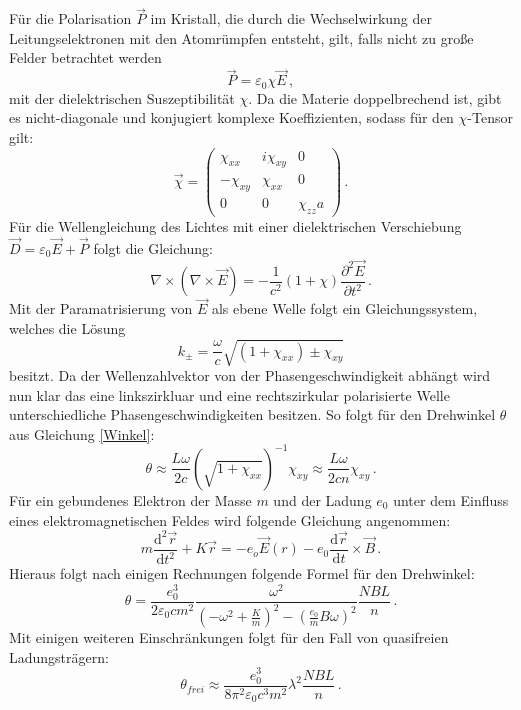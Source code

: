 Für die Polarisation $\vec{P}$ im Kristall, die durch die Wechselwirkung der Leitungselektronen mit den Atomrümpfen entsteht, gilt, falls nicht zu große Felder betrachtet werden
\begin{equation*}
	\vec{P}=\varepsilon_0 \chi \vec{E} \, \mathrm{,}
\end{equation*}
mit der dielektrischen Suszeptibilität $\chi$. Da die Materie doppelbrechend ist, gibt es nicht-diagonale und konjugiert komplexe Koeffizienten, sodass für den $\chi$-Tensor gilt:
\begin{equation*}
	\vec{\chi} =
	\begin{pmatrix}
		\chi_{xx} & i\chi_{xy} & 0 \\
		-\chi_{xy} & \chi_{xx} & 0 \\
		0 & 0 & \chi_{zz}a
	\end{pmatrix} \, \mathrm{.}
\end{equation*}
Für die Wellengleichung des Lichtes mit einer dielektrischen Verschiebung $\vec{D}=\varepsilon_0 \vec{E} + \vec{P}$ folgt die Gleichung:
\begin{equation*}
	\nabla \times (\nabla \times \vec{E}) = -\frac{1}{c^2}(1+\chi)\frac{\partial^2\vec{E}}{\partial t^2} \, \mathrm{.}
\end{equation*}
Mit der Paramatrisierung von $\vec{E}$ als ebene Welle folgt ein Gleichungssystem, welches die
Lösung
\begin{equation*}
	k_{\pm} = \frac{\omega}{c}\sqrt{(1+\chi_{xx}) \pm \chi_{xy}}
\end{equation*}
besitzt. Da der Wellenzahlvektor von der Phasengeschwindigkeit abhängt wird nun klar das eine linkszirkluar und eine rechtszirkular polarisierte Welle unterschiedliche Phasengeschwindigkeiten besitzen. So folgt für den Drehwinkel $\theta$ aus Gleichung \eqref{Winkel}:
\begin{equation*}
	\theta \approx \frac{L\omega}{2c}(\sqrt{1+\chi_{xx}})^{-1}\chi_{xy} \approx \frac{L\omega}{2cn}\chi_{xy} \, \mathrm{.}
\end{equation*}
Für ein gebundenes Elektron der Masse $m$ und der Ladung $e_0$ unter dem Einfluss eines elektromagnetischen Feldes wird folgende Gleichung angenommen:
\begin{equation*}
	m\frac{\mathrm{d}^2\vec{r}}{\mathrm{d}t^2}+K\vec{r} = - e_o \vec{E}(r) -e_0 \frac{\mathrm{d}\vec{r}}{\mathrm{d}t}\times \vec{B} \, \mathrm{.}
\end{equation*}
Hieraus folgt nach einigen Rechnungen folgende Formel für den Drehwinkel:
\begin{equation*}
	\theta = \frac{e_0^3}{2 \varepsilon_0 c m^2} \frac{\omega^2}{\left(-\omega^2+\frac{K}{m}
	\right)^2-\left(\frac{e_0}{m}B\omega\right)^2}\frac{NBL}{n} \, \mathrm{.}
\end{equation*}
Mit einigen weiteren Einschränkungen folgt für den Fall von quasifreien Ladungsträgern:
\begin{equation}\label{eqn:Masse}
	\theta_{frei}\approx\frac{e_0^3}{8 \pi^2 \varepsilon_0 c^3 m^2}\lambda^2\frac{NBL}{n} \, \mathrm{.}
\end{equation}

